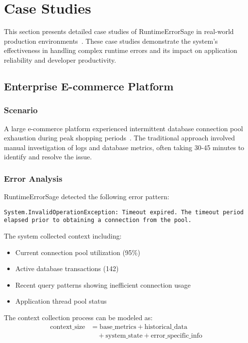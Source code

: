 \section{Case Studies}\label{sec:case-studies}

This section presents detailed case studies of RuntimeErrorSage in real-world production environments~\cite{production_error_analysis_2023, runtime_remediation_2024}. These case studies demonstrate the system's effectiveness in handling complex runtime errors and its impact on application reliability and developer productivity.

\subsection{Enterprise E-commerce Platform}

\subsubsection{Scenario}
A large e-commerce platform experienced intermittent database connection pool exhaustion during peak shopping periods~\cite{database_performance_2023}. The traditional approach involved manual investigation of logs and database metrics, often taking 30-45 minutes to identify and resolve the issue.

\subsubsection{Error Analysis}
RuntimeErrorSage detected the following error pattern:
\begin{lstlisting}[style=csharpstyle,caption={Database Connection Pool Error}]
System.InvalidOperationException: Timeout expired. The timeout period elapsed prior to obtaining a connection from the pool.
\end{lstlisting}

The system collected context including:
\begin{itemize}
    \item Current connection pool utilization (95\%)
    \item Active database transactions (142)
    \item Recent query patterns showing inefficient connection usage
    \item Application thread pool status
\end{itemize}

The context collection process can be modeled as:
\begin{equation}
\begin{split}
\text{context\_size} &= \text{base\_metrics} + \text{historical\_data} \\
&\quad + \text{system\_state} + \text{error\_specific\_info}
\end{split}
\end{equation}

